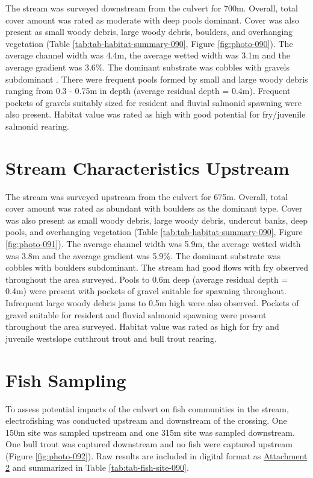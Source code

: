\documentclass[
]{book}
\begin{document}
The stream was surveyed downstream from the culvert for 700m. Overall, total cover amount was rated as moderate with deep pools dominant. Cover was also present as small woody debris, large woody debris, boulders, and overhanging vegetation (Table \ref{tab:tab-habitat-summary-090}, Figure \ref{fig:photo-090}). The average channel width was 4.4m, the average wetted width was 3.1m and the average gradient was 3.6\%. The dominant substrate was cobbles with gravels subdominant . There were frequent pools formed by small and large woody debris ranging from 0.3 - 0.75m in depth (average residual depth = 0.4m). Frequent pockets of gravels suitably sized for resident and fluvial salmonid spawning were also present. Habitat value was rated as high with good potential for fry/juvenile salmonid rearing.

\hypertarget{stream-characteristics-upstream-5}{%
\section*{Stream Characteristics Upstream}\label{stream-characteristics-upstream-5}}

The stream was surveyed upstream from the culvert for 675m. Overall, total cover amount was rated as abundant with boulders as the dominant type. Cover was also present as small woody debris, large woody debris, undercut banks, deep pools, and overhanging vegetation (Table \ref{tab:tab-habitat-summary-090}, Figure \ref{fig:photo-091}). The average channel width was 5.9m, the average wetted width was 3.8m and the average gradient was 5.9\%. The dominant substrate was cobbles with boulders subdominant. The stream had good flows with fry observed throughout the area surveyed. Pools to 0.6m deep (average residual depth = 0.4m) were present with pockets of gravel suitable for spawning throughout. Infrequent large woody debris jams to 0.5m high were also observed. Pockets of gravel suitable for resident and fluvial salmonid spawning were present throughout the area surveyed. Habitat value was rated as high for fry and juvenile westslope cutthrout trout and bull trout rearing.

\hypertarget{fish-sampling-2}{%
\section*{Fish Sampling}\label{fish-sampling-2}}

To assess potential impacts of the culvert on fish communities in the stream, electrofishing was conducted upstream and downstream of the crossing. One 150m site was sampled upstream and one 315m site was sampled downstream. One bull trout was captured downstream and no fish were captured upstream (Figure \ref{fig:photo-092}). Raw results are included in digital format as \href{https://github.com/NewGraphEnvironment/fish_passage_elk_2020_reporting/raw/master/data/habitat_confirmations.xls}{Attachment 2} and summarized in Table \ref{tab:tab-fish-site-090}.
\end{document}
